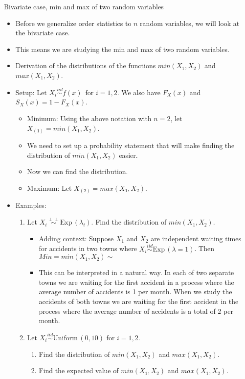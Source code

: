 \documentclass{article}
\newcommand{\ind}{\perp \!\!\! \perp}			%
\newcommand{\followsp}[2]{\overset{#1}\sim \text{#2}\,}		%
\newcommand{\order}[2]{#1_{(#2)}}		%
\begin{document}
Bivariate case, min and max of two random variables\bigskip
\begin{itemize}
    \item Before we generalize order statistics to $n$ random variables, we will look at the bivariate case.
    \item[] This means we are studying the min and max of two random variables.
    \item Derivation of the distributions of the functions $min(X_1, X_2)$ and $max(X_1, X_2)$.
    \item[] Setup: Let $X_i \followsp{iid}{$f(x)$}$ for $i = 1,2$. We also have $F_X(x)$ and $S_X(x) = 1 - F_X(x)$.
    \begin{itemize}
        \item Minimum: Using the above notation with $n = 2$, let $\order{X}{1} = min(X_1, X_2)$.
        \item We need to set up a probability statement that will make finding the distribution of $min(X_1, X_2)$ easier.\vspace{130pt}
        \item Now we can find the distribution.\vspace{170pt}
        \item Maximum: Let $\order{X}{2} = max(X_1, X_2)$.\vspace{250pt}
    \end{itemize}
    \item Examples:
    \begin{enumerate}
        \item Let $X_i \followsp{\ind}{Exp}(\lambda_i)$. Find the distribution of $min(X_1,X_2)$.\vspace{170pt}
        \begin{itemize}
            \item Adding context: Suppose $X_1$ and $X_2$ are independent waiting times for accidents in two towns where $X_i \followsp{iid}{Exp}(\lambda = 1)$. Then $Min = min(X_1,X_2) \sim$
            \item This can be interpreted in a natural way. In each of two separate towns we are waiting for the first accident in a process where the average number of accidents is 1 per month. When we study the accidents of both towns we are waiting for the first accident in the process where the average number of accidents is a total of 2 per month.
        \end{itemize}\bigskip
        \item Let $X_i \followsp{iid}{Uniform}(0,10)$ for $i = 1,2$.
        \begin{enumerate}
            \item Find the distribution of $min(X_1,X_2)$ and $max(X_1, X_2)$.\newpage
            \item Find the expected value of $min(X_1,X_2)$ and $max(X_1, X_2)$.\vspace{160pt}
        \end{enumerate}
    \end{enumerate}
\end{itemize}\bigskip
\end{document}
